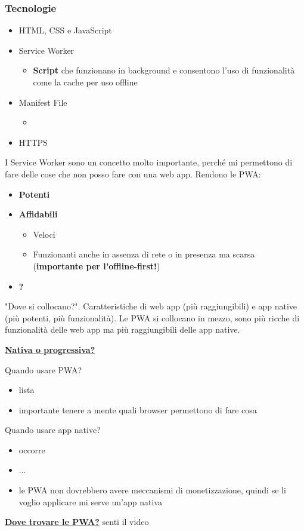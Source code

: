 \subsubsection{Tecnologie}
\begin{itemize}
    \item HTML, CSS e JavaScript
    \item Service Worker
    \begin{itemize}
        \item \textbf{Script} che funzionano in background e consentono l'uso di funzionalità come la cache per uso offline
    \end{itemize}
    \item Manifest File
    \begin{itemize}
        \item 
    \end{itemize}
    \item HTTPS
\end{itemize}
\par I Service Worker sono un concetto molto importante, perché mi permettono di fare delle cose che non posso fare con una web app. Rendono le PWA:
\begin{itemize}
    \item \textbf{Potenti}
    \item \textbf{Affidabili}
    \begin{itemize}
        \item Veloci
        \item Funzionanti anche in assenza di rete o in presenza ma scarsa (\textbf{importante per l'offline-first!})
    \end{itemize}
    \item \textbf{?}
\end{itemize}
\par "Dove si collocano?". Caratteristiche di web app (più raggiungibili) e app native (più potenti, più funzionalità). Le PWA si collocano in mezzo, sono più ricche di funzionalità delle web app ma più raggiungibili delle app native.
\par \textbf{\underline{Nativa o progressiva?}}
\par Quando usare PWA?
\begin{itemize}
    \item lista
    \item importante tenere a mente quali browser permettono di fare cosa
\end{itemize}
\par Quando usare app native?
\begin{itemize}
    \item occorre 
    \item ...
    \item le PWA non dovrebbero avere meccanismi di monetizzazione, quindi se li voglio applicare mi serve un'app nativa
\end{itemize}
\par \textbf{\underline{Dove trovare le PWA?}}
senti il video 

